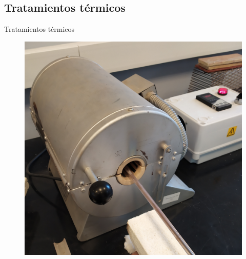 \documentclass[11pt]{beamer}
\begin{document}
	\subsection{Tratamientos térmicos}
		\begin{frame}{Tratamientos térmicos}
			\begin{figure}
				\centering
				\includegraphics[scale=0.3]{img/hornito.png}
			\end{figure}
		\end{frame}
	
\end{document}
